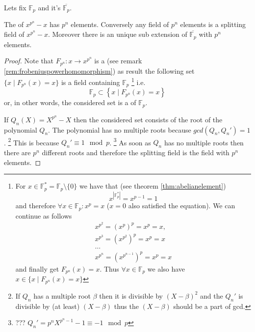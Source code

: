 \begin{theorem}
  Lets fix $\mathbb{F}_p$ and it's 
  $\overline{\mathbb{F}_p}$.

  The  of $x^{p^n} - x$ has $p^n$
  elements. Conversely any field of $p^n$ elements is a splitting
  field of $x^{p^n} - x$. Moreover there is an unique sub extension of
  $\overline{\mathbb{F}_p}$ with $p^n$ elements.
  \begin{proof}
    Note that $F_{p^n} : x \to x^{p^n}$ is a
     (see remark
    \ref{rem:frobeniuspowerhomomorphism}) as result the following set
    $\{
    x \mid F_{p^n}\left(x\right) = x
    \}$ is a field containing $\mathbb{F}_p$
    \footnote{
      For $x \in \mathbb{F}_p^{*} = \mathbb{F}_p \setminus \{0\}$ we
      have that (see theorem \ref{thm:abelianelement})
      \[
      x^{\left|\mathbb{F}_p^{*}\right|} = x^{p-1} = 1
      \]
      and therefore $\forall x \in \mathbb{F}_p: x^p = x$ ($x = 0$
      also satisfied the equation). We can continue as follows
      \begin{eqnarray}
        x^{p^2} = \left(x^p\right)^p = x^p = x,
        \nonumber \\
        x^{p^3} = \left(x^{p^2}\right)^p = x^p = x
        \nonumber \\
        \dots
        \nonumber \\
        x^{p^n} = \left(x^{p^{n-1}}\right)^p = x^p = x
        \nonumber
      \end{eqnarray}
      and finally get
      $F_{p^n}\left(x\right) = x$.
      Thus $\forall x \in \mathbb{F}_p$ we also have
      $x \in \{
      x \mid F_{p^n}\left(x\right) = x
      \}$
    }
    i.e.
    \[
    \mathbb{F}_p \subset
    \left\{
    x \mid F_{p^n}\left(x\right) = x
    \right\}
    \]
    or, in other words, the considered set is a  of
    $\mathbb{F}_p$.
    
    If $Q_n\left(X\right) = X^{p^n} - X$ then the considered set
    consists of the root of the polynomial $Q_n$. The polynomial has
    no multiple roots because $gcd(Q_n, Q_n') = 1$.
    \footnote{
      If $Q_n$ has a multiple root $\beta$ then it is divisible by
      $\left(X - \beta\right)^2$ and the $Q_n'$ is divisible by (at
      least) $\left(X - \beta\right)$ thus the $\left(X -
      \beta\right)$ should be a part of gcd.
    }
    This is because $Q_n' \equiv 1 \mod p$.
    \footnote{
      ??? $Q_n' = p^n X^{p^n - 1} - 1 \equiv -1 \mod p$
    }
    As soon as $Q_n$ has no multiple roots then there are $p^n$
    different roots and therefore the splitting field is the field
    with $p^n$ elements.


\end{proof}
\end{theorem}
